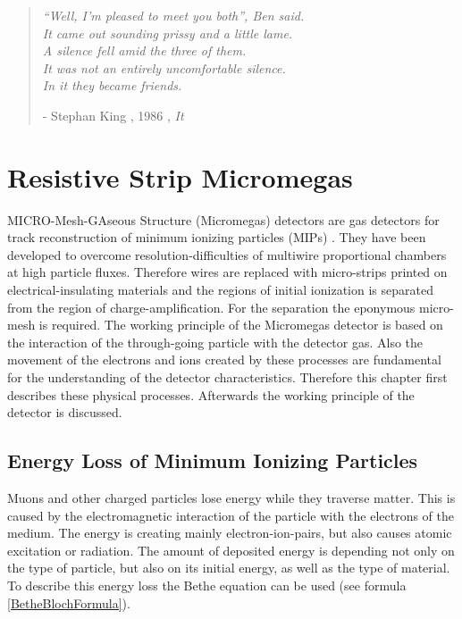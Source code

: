 \documentclass[
twoside,            %
BCOR1.4cm,          %
10pt,               %
headings=normal,    %
headsepline,        %
clearplainpage,		%
final,              %
div=14,
open=right,
bibliography=toc
]{scrreprt}
\begin{document}
\vspace*{\fill} 
\begin{quote} 
	\textit{
		``Well, I'm pleased to meet you both'', Ben said.
		\\
		It came out sounding prissy and a little lame.
		\\
		A silence fell amid the three of them.
		\\
		It was not an entirely uncomfortable silence.
		\\
		In it they became friends.
	}
	
	\hfill - Stephan King , 1986 , \textit{It}
\end{quote}
\vspace*{\fill}

\chapter{Resistive Strip Micromegas}

MICRO-Mesh-GAseous Structure (Micromegas) detectors are gas detectors for track reconstruction of minimum ionizing particles (MIPs) 
\cite{micromegas}.
They have been developed to overcome resolution-difficulties of multiwire proportional chambers at high particle fluxes.
Therefore wires are replaced with micro-strips printed on electrical-insulating materials and the regions of initial ionization is separated from the region of charge-amplification.
For the separation the eponymous micro-mesh is required.
The working principle of the Micromegas detector is based on the interaction of the through-going particle with the detector gas.
Also the movement of the electrons and ions created by these processes are fundamental for the understanding of the detector characteristics.
Therefore this chapter first describes these physical processes.
Afterwards the working principle of the detector is discussed.

\section{Energy Loss of Minimum Ionizing Particles}\label{energyLoss}

Muons and other charged particles lose energy while they traverse matter.
This is caused by the electromagnetic interaction of the particle with the electrons of the medium.
The energy is creating mainly electron-ion-pairs, but also causes atomic excitation or radiation.
The amount of deposited energy is depending not only on the type of particle, but also on its initial energy, as well as the type of material.
To describe this energy loss the Bethe equation can be used (see formula \ref{BetheBlochFormula}).
\end{document}
